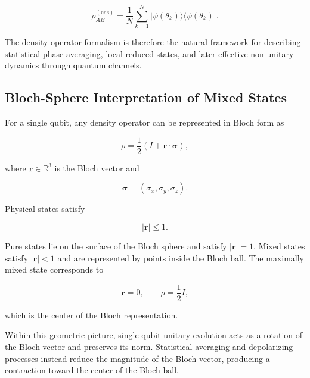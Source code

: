\begin{equation}
\rho_{AB}^{(\mathrm{ens})}
=
\frac{1}{N}
\sum_{k=1}^{N}
|\psi(\theta_k)\rangle
\langle \psi(\theta_k)|.
\label{eq:mixed_state_ensemble_realizations}
\end{equation}

\medskip

The density-operator formalism is therefore the natural framework for describing statistical phase averaging, local reduced states, and later effective non-unitary dynamics through quantum channels.


\subsection{Bloch-Sphere Interpretation of Mixed States}
\label{subsec:bloch_sphere_interpretation_mixed_states}

For a single qubit, any density operator can be represented in Bloch form as

\begin{equation}
\rho
=
\frac{1}{2}
\left(
I + \mathbf{r}\cdot\boldsymbol{\sigma}
\right),
\label{eq:bloch_density_representation}
\end{equation}

where \( \mathbf{r}\in\mathbb{R}^3 \) is the Bloch vector and

\[
\boldsymbol{\sigma}
=
(\sigma_x,\sigma_y,\sigma_z).
\]

Physical states satisfy

\begin{equation}
|\mathbf{r}| \leq 1.
\label{eq:bloch_ball_condition}
\end{equation}

Pure states lie on the surface of the Bloch sphere and satisfy \( |\mathbf{r}|=1 \). Mixed states satisfy \( |\mathbf{r}|<1 \) and are represented by points inside the Bloch ball. The maximally mixed state corresponds to

\[
\mathbf{r}=0,
\qquad
\rho=\frac{1}{2}I,
\]

which is the center of the Bloch representation.

\medskip

Within this geometric picture, single-qubit unitary evolution acts as a rotation of the Bloch vector and preserves its norm. Statistical averaging and depolarizing processes instead reduce the magnitude of the Bloch vector, producing a contraction toward the center of the Bloch ball.


